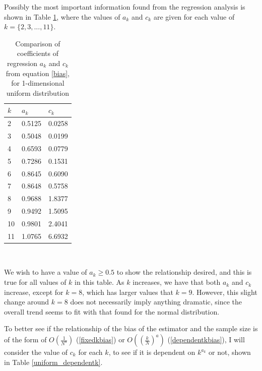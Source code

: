\documentclass[12pt]{report}
\begin{document}
Possibly the most important information found from the regression analysis is shown in Table \ref{uniform_a_c_compare_table}, where the values of $a_{k}$ and $c_{k}$ are given for each value of $k = \{ 2, 3, ..., 11\}$.

\begin{table}
\caption{Comparison of coefficients of regression $a_{k}$ and $c_{k}$ from equation \ref{bias}, for 1-dimensional uniform distribution} \label{uniform_a_c_compare_table}
\begin{center}
\begin{tabular}{| l | l l |} 
\toprule
$k$ &  $a_{k}$ & $c_{k}$ \\
\midrule[1pt]
2     & 0.5125    & 0.0258   \\
3     & 0.5048    & 0.0199   \\
4     & 0.6593    & 0.0779   \\
5     & 0.7286    & 0.1531   \\
6     & 0.8645    & 0.6090   \\
7     & 0.8648    & 0.5758   \\
8     & 0.9688    & 1.8377   \\
9     & 0.9492    & 1.5095   \\
10    & 0.9801    & 2.4041   \\
11    & 1.0765    & 6.6932   \\
\hline
\end{tabular}
\\[10pt]
\end{center}
\end{table}

We wish to have a value of $a_{k} \geq 0.5$ to show the relationship desired, and this is true for all values of $k$ in this table. As $k$ increases, we have that both $a_{k}$ and $c_{k}$ increase, except for $k=8$, which has larger values that $k=9$. However, this slight change around $k=8$ does not necessarily imply anything dramatic, since the overall trend seems to fit with that found for the normal distribution.

To better see if the relationship of the bias of the estimator and the sample size is of the form of $O \left( \frac{1}{N^{a}} \right)$ (\ref{fixedkbias}) or $O\left( \left( \frac{k}{N} \right)^{a} \right)$ (\ref{dependentkbias}), I will consider the value of $c_{k}$ for each $k$, to see if it is dependent on $k^{a_{k}}$ or not, shown in Table \ref{uniform_dependentk}.
\end{document}

